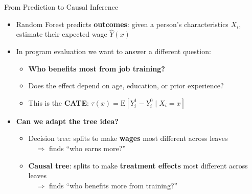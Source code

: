 \documentclass[dvipsnames,hyperref={pdfpagelabels=false}]{beamer}
\begin{document}
\author{}
\institute{}
\date{}

\begin{frame}{}
	\titlepage
\end{frame}




\begin{frame}{From Prediction to Causal Inference}
	\begin{itemize}
		\item Random Forest predicts \textbf{outcomes}: given a person's characteristics $X_i$, estimate their expected wage $\hat{Y}(x)$
		\vspace{0.3cm}
		\item In program evaluation we want to answer a different question:
		\vspace{0.2cm}
		\begin{itemize}
			\item \textbf{Who benefits most from job training?}
			\vspace{0.1cm}
			\item Does the effect depend on age, education, or prior experience?
			\vspace{0.1cm}
			\item This is the \textbf{CATE}: $\tau(x) = \mathrm{E}[Y^1_i - Y^0_i \mid X_i = x]$
		\end{itemize}
		\vspace{0.3cm}
		\item \textbf{Can we adapt the tree idea?}
		\vspace{0.2cm}
		\begin{itemize}
			\item Decision tree: splits to make \textbf{wages} most different across leaves\\
			$\quad\Rightarrow$ finds ``who earns more?''
			\vspace{0.15cm}
			\item \textbf{Causal tree}: splits to make \textbf{treatment effects} most different across leaves\\
			$\quad\Rightarrow$ finds ``who benefits more from training?''
		\end{itemize}
	\end{itemize}
\end{frame}
\end{document}
